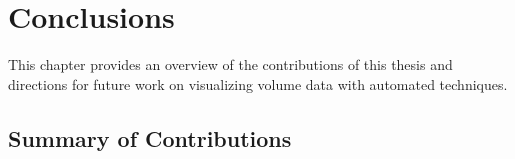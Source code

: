 \chapter{Conclusions \label{conclusions}}

This chapter provides an overview of the contributions of this thesis and directions for future work on visualizing volume data with automated techniques.

\section{Summary of Contributions}


